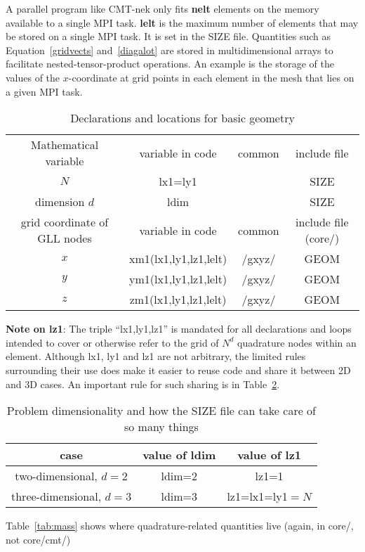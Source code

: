 A parallel program like CMT-nek only fits
\textbf{nelt} elements on the memory available to a single MPI task. \textbf{lelt}
is the maximum number of elements that may be stored on a single MPI task. It is
set in the SIZE file. Quantities such as Equation~\ref{gridvects} and~\ref{diagalot}
are stored in multidimensional arrays to facilitate nested-tensor-product operations.
An example is the storage of the values of the $x$-coordinate at grid points in each element in
the mesh that lies on a given MPI task.
\begin{table}
\begin{tabular}{|c|c|c|c|}
\hline
Mathematical variable & variable in code & common & include file \\
$N$ & lx1=ly1 &  & SIZE \\
dimension $d$ & ldim &  & SIZE \\
\hline
grid coordinate of GLL nodes & variable in code & common & include file (core/)\\
\hline
$x$ & xm1(lx1,ly1,lz1,lelt) & /gxyz/ & GEOM \\
$y$ & ym1(lx1,ly1,lz1,lelt) & /gxyz/ & GEOM \\
$z$ & zm1(lx1,ly1,lz1,lelt) & /gxyz/ & GEOM \\
\hline
\end{tabular}
\caption{Declarations and locations for basic geometry}
\label{tab:xm1gridvect}
\end{table}

\textbf{Note on lz1}: The triple ``lx1,ly1,lz1'' is mandated for all declarations and loops intended
to cover or otherwise refer to the grid of $N^d$ quadrature nodes within an element. 
Although lx1, ly1 and lz1 are not
arbitrary, the limited rules surrounding their use does make it easier to reuse code
and share it between 2D and 3D cases. An important rule for such sharing is in
Table~\ref{tab:dimz}.
\begin{table}
\begin{tabular}{|c|c|c|}
\hline
case & value of ldim & value of lz1 \\
\hline
two-dimensional, $d=2$ & ldim=2 & lz1=1 \\
three-dimensional, $d=3$ & ldim=3 & lz1=lx1=ly1$=N$ \\
\hline
\end{tabular}
\caption{Problem dimensionality and how the SIZE file can take care of so many things}
\label{tab:dimz}
\end{table}

Table~\ref{tab:mass} shows where quadrature-related
quantities live (again, in core/, not core/cmt/)

